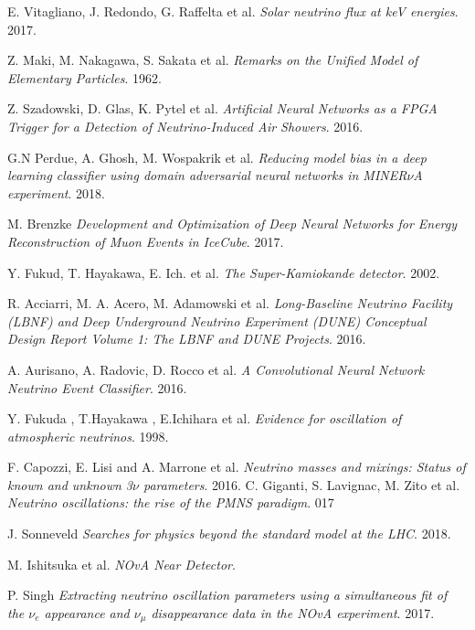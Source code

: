 \documentclass{report}
\begin{document}
\begin{thebibliography}{}

E. Vitagliano, J. Redondo, G. Raffelta et al.
\textit{Solar neutrino flux at keV energies}. 
2017.

Z. Maki, M. Nakagawa, S. Sakata et al.
\textit{Remarks on the Unified Model of Elementary Particles}. 
1962.

Z. Szadowski, D. Glas, K. Pytel et al.
\textit{Artificial Neural Networks as a FPGA Trigger for a Detection of Neutrino-Induced Air Showers}. 
2016.

G.N Perdue, A. Ghosh, M. Wospakrik et al.
\textit{Reducing model bias in a deep learning classifier using domain adversarial neural networks in MINER$\nu$A experiment}. 
2018.

M. Brenzke
\textit{Development and Optimization of Deep Neural Networks for Energy Reconstruction of Muon Events in IceCube}. 
2017.

 Y. Fukud, T. Hayakawa, E. Ich. et al.
\textit{The Super-Kamiokande detector}.
2002.



R. Acciarri, M. A. Acero, M. Adamowski et al.
\textit{Long-Baseline Neutrino Facility (LBNF) and Deep Underground Neutrino Experiment (DUNE) Conceptual Design Report Volume 1: The LBNF and DUNE Projects}. 
2016.

A. Aurisano, A. Radovic, D. Rocco et al.
\textit{A Convolutional Neural Network Neutrino Event Classifier}. 
2016.

Y. Fukuda , T.Hayakawa , E.Ichihara et al.
\textit{Evidence for oscillation of atmospheric neutrinos}. 
1998.

F. Capozzi, E. Lisi and A. Marrone et al.
\textit{Neutrino masses and mixings: Status of known and unknown 3$\nu$ parameters}. 
2016.
C. Giganti, S. Lavignac, M. Zito et al.
\textit{Neutrino oscillations: the rise of the PMNS paradigm}. 017

J. Sonneveld
\textit{Searches for physics beyond the standard model at the LHC}. 
2018.

M. Ishitsuka et al.
\textit{NOvA Near Detector}.

P. Singh
\textit{Extracting neutrino oscillation parameters using a simultaneous fit of the $\nu_e$ appearance and $\nu_\mu$ disappearance data in the NOvA experiment}.
2017.


\end{thebibliography}
\end{document}
